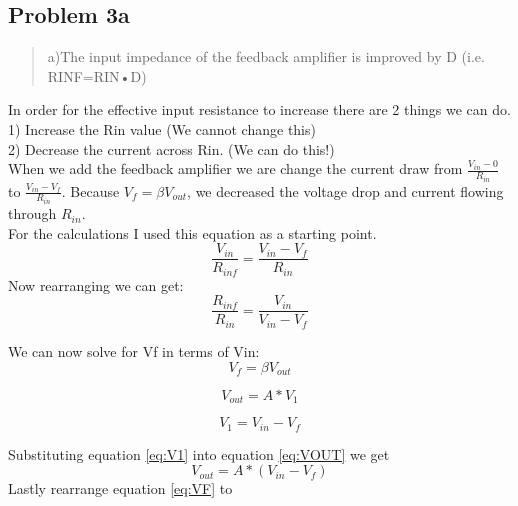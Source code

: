\documentclass[10pt,a4paper]{article}
\let\oldsubsection\subsection
\renewcommand{\subsection}{%
    \setcounter{equation}{0}%
    \oldsubsection%
}
\begin{document}
\subsection{Problem 3a}
\begin{quote}
a)The input impedance of the feedback amplifier is improved by D (i.e. RINF=RIN•D)\\
\end{quote}

\begin{multicols}{2}

In order for the effective input resistance to increase there are 2 things we can do. \\
1) Increase the Rin value (We cannot change this)\\
2) Decrease the current across Rin. (We can do this!)\\

When we add the feedback amplifier we are change the current draw from $\frac{V_{in} - 0}{R_{in}}$ to $\frac{V_{in} - V_f}{R_{in}}$. Because $V_f = \beta V_{out}$, we decreased the voltage drop and current flowing through $R_{in}$.\\


For the calculations I used this equation as a starting point.\\

\begin{equation}
\frac{V_{in}}{R_{inf}} = \frac{V_{in} - V_{f}}{R_{in}}
\end{equation}
Now rearranging we can get:\\
\begin{equation}
\frac{R_{inf}}{R_{in}} = \frac{V_{in}}{V_{in} - V_{f}}
\end{equation}

We can now solve for Vf in terms of Vin: 
\begin{equation}
\label{eq:VF}
V_f = \beta V_{out}
\end{equation}

\begin{equation}
\label{eq:VOUT}
V_{out} = A * V_1
\end{equation}

\begin{equation}
\label{eq:V1}
V_1 = V_{in} - V_f
\end{equation}

Substituting equation \ref{eq:V1} into equation \ref{eq:VOUT} we get\\

\begin{equation}
\label{eq:VOUT_VF}
V_{out} = A * (V_{in} - V_f)
\end{equation}
Lastly rearrange equation \ref{eq:VF} to\\


\end{multicols}
\end{document}
